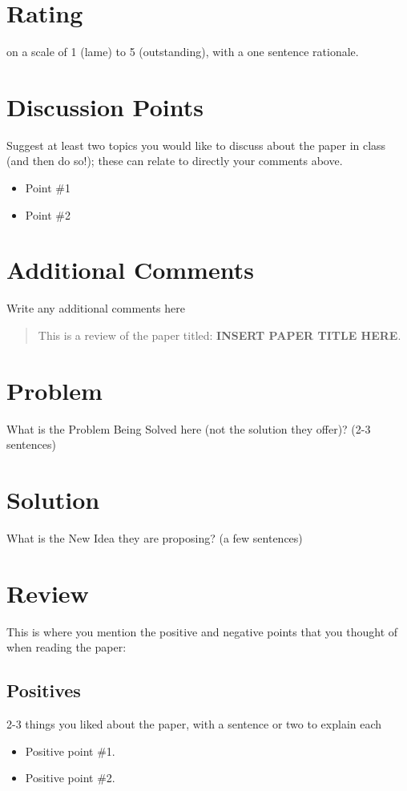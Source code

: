 \documentclass[sigconf, 10pt]{acmart}
\begin{document}
\section{Rating}
on a scale of 1 (lame) to 5 (outstanding), with a one sentence rationale.

\section{Discussion Points}
Suggest at least two topics you would like to discuss about the paper in class (and then do so!); these can relate to directly your comments above. 
\begin{itemize}
    \item Point \#1
    \item Point \#2
\end{itemize}

\section{Additional Comments}
Write any additional comments here
\pagebreak
\begin{abstract}
    This is a review of the paper titled: \textbf{INSERT PAPER TITLE HERE}.
\end{abstract}
\balance
\section{Problem}
What is the Problem Being Solved here (not the solution they offer)? (2-3 sentences)
\section{Solution}
What is the New Idea they are proposing?  (a few sentences)
\section{Review}
This is where you mention the positive and negative points that you thought of when reading the paper:
\subsection{Positives}
2-3 things you liked about the paper, with a sentence or two to explain each
\begin{itemize}
    \item Positive point \#1.
    \item Positive point \#2.
\end{itemize}
\end{document}
